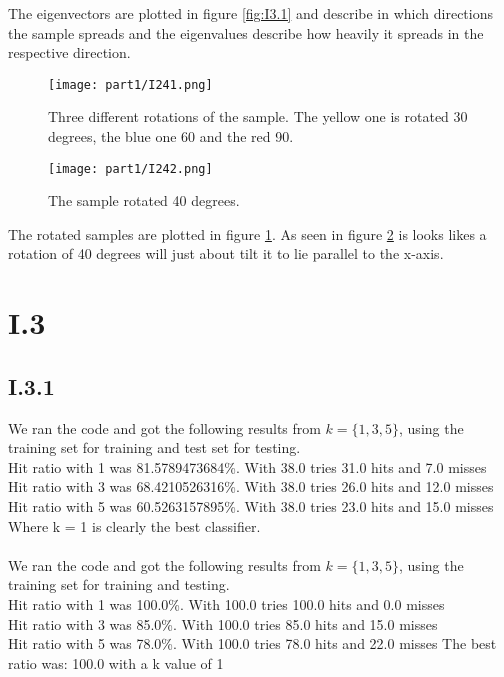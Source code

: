 \documentclass{article}
\begin{document}
The eigenvectors are plotted in figure \ref{fig:I3.1} and describe in which
directions the sample spreads and the eigenvalues describe how heavily it
spreads in the respective direction.

\begin{figure}[!ht]
    \centering
    \texttt{[image: part1/I241.png]}
    \caption{Three different rotations of the sample. The yellow one is
    rotated 30 degrees, the blue one 60 and the red 90.}
    \label{fig:I4.1}
\end{figure}

\begin{figure}[!ht]
    \centering
    \texttt{[image: part1/I242.png]}
    \caption{The sample rotated 40 degrees.}
    \label{fig:I4.2}
\end{figure}

The rotated samples are plotted in figure \ref{fig:I4.1}. As seen in
figure \ref{fig:I4.2} is looks likes a rotation of 40 degrees will just
about tilt it to lie parallel to the x-axis.




\section{I.3}


\subsection{I.3.1}
We ran the code and got the following results from $k = \{1,3,5\}$, using the training set for training and test set for testing.\\ 
Hit ratio with 1 was 81.5789473684\%. With 38.0 tries 31.0 hits and 7.0 misses\\
Hit ratio with 3 was 68.4210526316\%. With 38.0 tries 26.0 hits and 12.0 misses\\
Hit ratio with 5 was 60.5263157895\%. With 38.0 tries 23.0 hits and 15.0 misses\\
Where k = 1 is clearly the best classifier.\\\\
We ran the code and got the following results from $k = \{1,3,5\}$, using the training set for training and testing.\\ 
Hit ratio with 1 was 100.0\%. With 100.0 tries 100.0 hits and 0.0 misses\\
Hit ratio with 3 was 85.0\%. With 100.0 tries 85.0 hits and 15.0 misses\\
Hit ratio with 5 was 78.0\%. With 100.0 tries 78.0 hits and 22.0 misses
The best ratio was: 100.0 with a k value of 1
\end{document}
